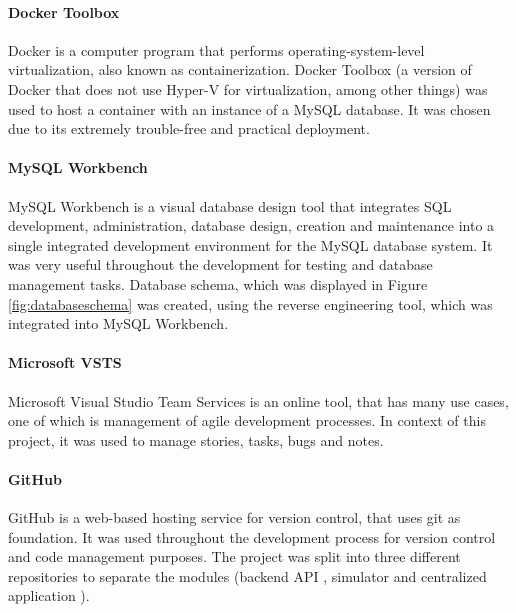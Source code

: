 \paragraph{Docker Toolbox}
Docker is a computer program that performs operating-system-level virtualization, also known as containerization. Docker Toolbox (a version of Docker that does not use Hyper-V for virtualization, among other things) was used to host a container with an instance of a MySQL database. It was chosen due to its extremely trouble-free and practical deployment. 

\paragraph{MySQL Workbench}
MySQL Workbench is a visual database design tool that integrates SQL development, administration, database design, creation and maintenance into a single integrated development environment for the MySQL database system. It was very useful throughout the development for testing and database management tasks. Database schema, which was displayed in Figure \ref{fig:databaseschema} was created, using the reverse engineering tool, which was integrated into MySQL Workbench.

\paragraph{Microsoft VSTS}
Microsoft Visual Studio Team Services is an online tool, that has many use cases, one of which is management of agile development processes. In context of this project, it was used to manage stories, tasks, bugs and notes. 

\paragraph{GitHub}
GitHub is a web-based hosting service for version control, that uses git as foundation. It was used throughout the development process for version control and code management purposes. The project was split into three different repositories to separate the modules (backend API \citep{gitapi}, simulator \citep{gitsim} and centralized application \citep{gitapp}).  